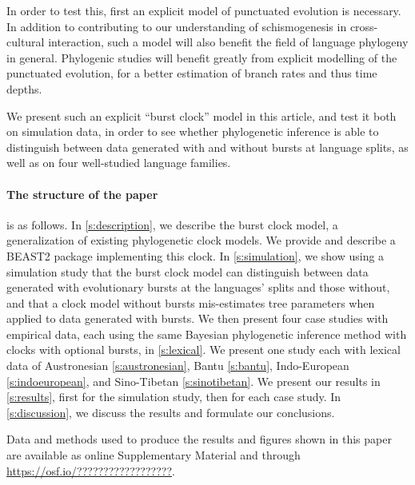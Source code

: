 \documentclass[]{rsos}%
\begin{document}
In order to test this, first an explicit model of punctuated evolution
is necessary. In addition to contributing to our understanding of
schismogenesis in cross-cultural interaction, such a model will also benefit
the field of language phylogeny in general. Phylogenic studies will benefit
greatly from explicit modelling of the punctuated evolution, for a better
estimation of branch rates and thus time depths.

We present such an explicit “burst clock” model in this article, and test it
both on simulation data, in order to see whether phylogenetic inference is able
to distinguish between data generated with and without bursts at language
splits, as well as on four well-studied language families.

\paragraph{The structure of the paper} is as follows. In \cref{s:description},
we describe the burst clock model, a generalization of existing phylogenetic
clock models. We provide and describe a BEAST2 \parencite{drummond2015bayesian}
package implementing this clock. In \cref{s:simulation}, we show using a
simulation study that the burst clock model can distinguish between data
generated with evolutionary bursts at the languages' splits and those without,
and that a clock model without bursts mis-estimates tree parameters when applied
to data generated with bursts. We then present four case studies with empirical
data, each using the same Bayesian phylogenetic inference method with clocks
with optional bursts, in \cref{s:lexical}. We present one study each with
lexical data of Austronesian \ref{s:austronesian}, Bantu \ref{s:bantu},
Indo-European \ref{s:indoeuropean}, and Sino-Tibetan \ref{s:sinotibetan}. We
present our results in \cref{s:results}, first for the simulation study, then
for each case study. In \cref{s:discussion}, we discuss the results and
formulate our conclusions.

Data and methods used to produce the results and figures shown in this paper are
available as online Supplementary Material and through
\url{https://osf.io/??????????????????}.
\end{document}
